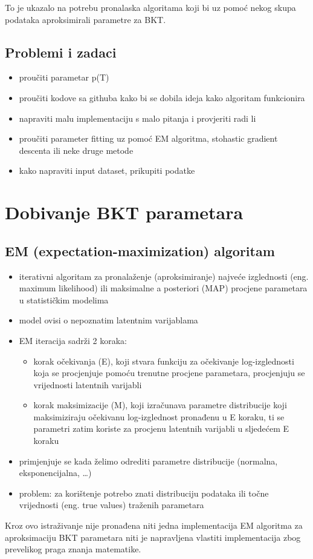 \documentclass{report}
\begin{document}
		To je ukazalo na potrebu pronalaska algoritama koji bi uz pomoć nekog skupa podataka aproksimirali parametre za BKT.
	\section{Problemi i zadaci}
	\begin{itemize}
		\item proučiti parametar p(T)
		\item proučiti kodove sa githuba kako bi se dobila ideja kako algoritam funkcionira
		\item napraviti malu implementaciju s malo pitanja i provjeriti radi li
		\item proučiti parameter fitting uz pomoć EM algoritma, stohastic gradient descenta ili neke druge metode
		\item kako napraviti input dataset, prikupiti podatke
		
	
	\end{itemize}
	\chapter{Dobivanje BKT parametara}
	\section{EM (expectation-maximization) algoritam}
		\begin{itemize}
			\item iterativni algoritam za pronalaženje (aproksimiranje) najveće izglednosti (eng. maximum likelihood) ili maksimalne a posteriori (MAP) procjene parametara u statističkim modelima
			\item model ovisi o nepoznatim latentnim varijablama
			\item EM iteracija sadrži 2 koraka:
				\begin{itemize}
					\item 	korak očekivanja (E), koji stvara funkciju za očekivanje log-izglednosti koja se procjenjuje pomoću trenutne procjene parametara, procjenjuju se vrijednosti latentnih varijabli
					\item 	korak maksimizacije (M), koji izračunava parametre distribucije koji maksimiziraju očekivanu log-izglednost pronađenu u E koraku, ti se parametri zatim koriste za procjenu latentnih varijabli u sljedećem E koraku
				\end{itemize}
			
			\item primjenjuje se kada želimo odrediti parametre distribucije (normalna, eksponencijalna, …)
			\item problem: za korištenje potrebo znati distribuciju podataka ili točne vrijednosti (eng. true values) traženih parametara
			
		\end{itemize}
	Kroz ovo istraživanje nije pronađena niti jedna implementacija EM algoritma za aproksimaciju BKT parametara niti je napravljena vlastiti implementacija zbog prevelikog praga znanja matematike.
	
\end{document}
